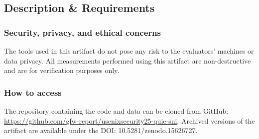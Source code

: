 \subsection{Description \& Requirements}


\subsubsection{Security, privacy, and ethical concerns}
The tools used in this artifact do not pose any risk to the evaluators' machines
or data privacy. All measurements performed using this artifact are non-destructive and
are for verification purposes only.


\subsubsection{How to access}
The repository containing the code and data can be cloned from GitHub:\@
\url{https://github.com/gfw-report/usenixsecurity25-quic-sni}. Archived versions
of the artifact are available under the DOI: 10.5281/zenodo.15626727.

